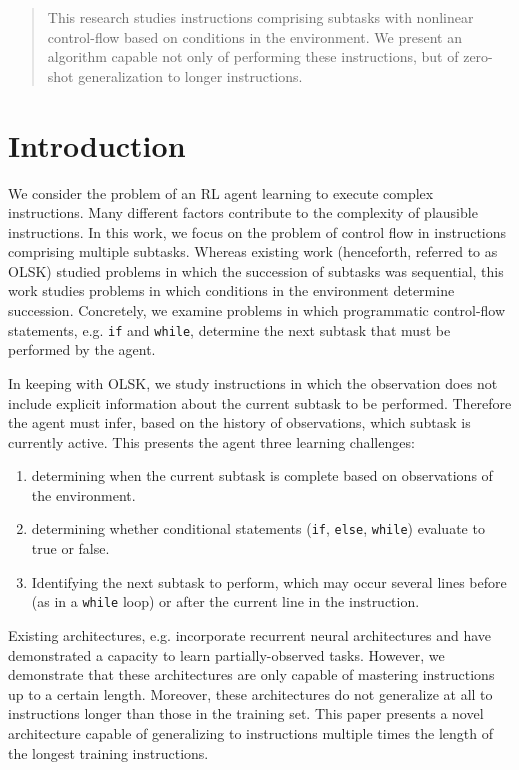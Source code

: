 \documentclass{article}
\begin{document}

\begin{abstract}
  This research studies instructions comprising subtasks with nonlinear control-flow based on conditions in
  the environment. We present an algorithm capable not only of performing these
  instructions, but of zero-shot generalization to longer instructions.
\end{abstract}

\section{Introduction}
 We consider the problem of an RL agent learning to execute complex instructions.
 Many different factors contribute to the
complexity of plausible instructions. In this work, we focus on the problem of
control flow in instructions comprising multiple subtasks. Whereas existing work
\cite{oh2017zero} (henceforth, referred to as OLSK) studied problems in which the succession of subtasks was
sequential, this work studies problems in which conditions in the environment
determine succession. Concretely, we examine problems in which programmatic
control-flow statements, e.g. \texttt{if} and \texttt{while}, determine the next subtask
that must be performed by the agent. 

In keeping with OLSK, we study instructions in which the observation does
not include explicit information about the current subtask to be performed.
Therefore the agent must infer, based on the history of observations, which
subtask is currently active. This presents the agent three learning challenges:
\begin{enumerate}
  \item determining when the current subtask is complete based on observations of
    the environment.
  \item determining whether conditional statements (\texttt{if}, \texttt{else},
    \texttt{while}) evaluate to true or false.
  \item Identifying the next subtask to perform, which may occur several lines before (as in a
    \texttt{while} loop) or after the current line in the instruction.
\end{enumerate}

Existing architectures, e.g. \citet{heess2015memory} incorporate recurrent neural
architectures and have demonstrated a capacity to learn partially-observed
tasks. However, we demonstrate that these architectures are only capable of
mastering instructions up to a certain length. Moreover, these architectures do not
generalize at all to instructions longer than those in the training set. This paper presents a novel architecture capable of generalizing
to instructions multiple times the length of the longest training instructions.
\end{document}
